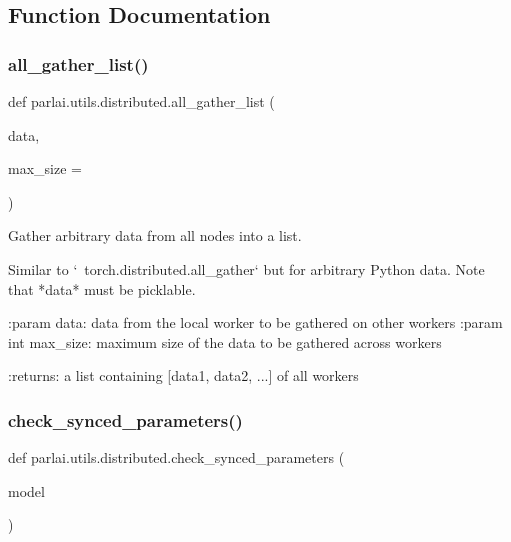 \subsection{Function Documentation}
\mbox{\label{namespaceparlai_1_1utils_1_1distributed_a9ef5bf0debf512ddbeb045327bfd87ef}} 
\subsubsection{\texorpdfstring{all\+\_\+gather\+\_\+list()}{all\_gather\_list()}}
{\footnotesize\ttfamily def parlai.\+utils.\+distributed.\+all\+\_\+gather\+\_\+list (\begin{DoxyParamCaption}\item[{}]{data,  }\item[{}]{max\+\_\+size = {} }\end{DoxyParamCaption})}

\begin{DoxyVerb}Gather arbitrary data from all nodes into a list.

Similar to `~torch.distributed.all_gather` but for arbitrary Python
data. Note that *data* must be picklable.

:param data:
    data from the local worker to be gathered on other workers
:param int max_size:
    maximum size of the data to be gathered across workers

:returns:
    a list containing [data1, data2, ...] of all workers
\end{DoxyVerb}
 \mbox{\label{namespaceparlai_1_1utils_1_1distributed_afc64140f9a6437dc1a2b2bd4294ba8ef}} 
\subsubsection{\texorpdfstring{check\+\_\+synced\+\_\+parameters()}{check\_synced\_parameters()}}
{\footnotesize\ttfamily def parlai.\+utils.\+distributed.\+check\+\_\+synced\+\_\+parameters (\begin{DoxyParamCaption}\item[{}]{model }\end{DoxyParamCaption})}

